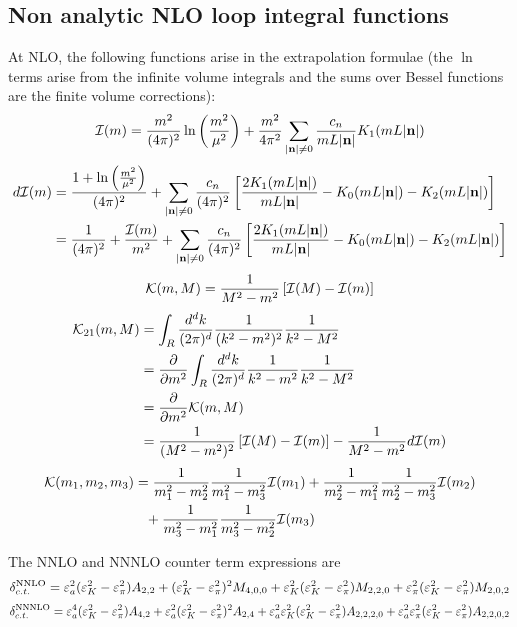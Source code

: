 \documentclass[prd,11pt,tightenlines,preprintnumbers,showpacs,superscriptaddress,notitlepage,nofootinbib,eqsecnum,floatfix,longbibliography]{revtex4-1}
\begin{document}
\subsection{Non analytic NLO loop integral functions}
At NLO, the following functions arise in the extrapolation formulae (the $\ln$ terms arise from the infinite volume integrals and the sums over Bessel functions are the finite volume corrections):
\begin{equation}
{\mathcal I}(m) = \frac{m^2}{(4\pi)^2} \ln \left( \frac{m^2}{\mu^2} \right)
	+ \frac{m^2}{4\pi^2} \sum_{|\mathbf{n}|\neq0} \frac{c_n}{mL|\mathbf{n}|} K_1(mL|\mathbf{n}|)
\end{equation}
\begin{align}
d{\mathcal I}(m) &= \frac{1 + \ln \left( \frac{m^2}{\mu^2} \right)}{(4\pi)^2} 
	+\sum_{|\mathbf{n}|\neq0} \frac{c_n}{(4\pi)^2} \left[
		\frac{2K_1(mL|\mathbf{n}|)}{mL|\mathbf{n}|}
		-K_0(mL|\mathbf{n}|)
		-K_2(mL|\mathbf{n}|)
	\right]
\nonumber\\&=
	\frac{1}{(4\pi)^2} + \frac{{\mathcal I}(m)}{m^2}
	+\sum_{|\mathbf{n}|\neq0} \frac{c_n}{(4\pi)^2} \left[
		\frac{2K_1(mL|\mathbf{n}|)}{mL|\mathbf{n}|}
		-K_0(mL|\mathbf{n}|)
		-K_2(mL|\mathbf{n}|)
	\right]
\end{align}
\begin{equation}
{\mathcal K}(m,M) = \frac{1}{M^2 - m^2} \left[ {\mathcal I}(M) - {\mathcal I}(m) \right]
\end{equation}
\begin{align}
{\mathcal K}_{21}(m,M) &= \int_R \frac{d^d k}{(2\pi)^d} \frac{1}{(k^2 -m^2)^2} \frac{1}{k^2 - M^2}
\nonumber\\&=
	\frac{\partial}{\partial m^2} \int_R \frac{d^d k}{(2\pi)^d} \frac{1}{k^2 -m^2} \frac{1}{k^2 - M^2}
\nonumber\\&=
	\frac{\partial}{\partial m^2} {\mathcal K}(m,M)
\nonumber\\&=
	\frac{1}{(M^2 - m^2)^2} \left[ {\mathcal I}(M) - {\mathcal I}(m) \right]
	-\frac{1}{M^2 - m^2} d{\mathcal I}(m)
\end{align}
\begin{align}
{\mathcal K}(m_1,m_2,m_3) &= \frac{1}{m_1^2 - m_2^2}\frac{1}{m_1^2-m_3^2} {\mathcal I}(m_1)
	+\frac{1}{m_2^2 - m_1^2} \frac{1}{m_2^2 - m_3^2} {\mathcal I}(m_2)
\nonumber\\&\phantom{=}
	+\frac{1}{m_3^2 - m_1^2} \frac{1}{m_3^2 - m_2^2} {\mathcal I}(m_3)
\end{align}


The NNLO and NNNLO counter term expressions are 
\begin{equation}
{\delta}_{c.t.}^{\rm NNLO} = {\varepsilon}_a^2 ({\varepsilon}_K^2 - {\varepsilon}_\pi^2) A_{2,2}
	+({\varepsilon}_K^2 - {\varepsilon}_\pi^2)^2 M_{4,0,0}
	+{\varepsilon}_K^2 ({\varepsilon}_K^2 - {\varepsilon}_\pi^2) M_{2,2,0}
	+{\varepsilon}_\pi^2 ({\varepsilon}_K^2 - {\varepsilon}_\pi^2) M_{2,0,2}
\end{equation}
\begin{equation}
{\delta}_{c.t.}^{\rm NNNLO} = {\varepsilon}_a^4 ({\varepsilon}_K^2 - {\varepsilon}_\pi^2) A_{4,2}
	+{\varepsilon}_a^2 ({\varepsilon}_K^2 - {\varepsilon}_\pi^2)^2 A_{2,4}
	+{\varepsilon}_a^2 {\varepsilon}_K^2 ({\varepsilon}_K^2 - {\varepsilon}_\pi^2) A_{2,2,2,0}
	+{\varepsilon}_a^2 {\varepsilon}_\pi^2 ({\varepsilon}_K^2 - {\varepsilon}_\pi^2) A_{2,2,0,2}
\end{equation}
\end{document}
